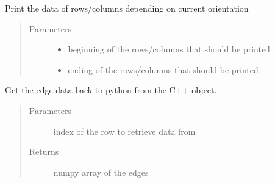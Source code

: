 \documentclass[a4paper,10pt,english]{sphinxmanual}
\begin{document}
\begin{fulllineitems}

\begin{fulllineitems}
\label{\detokenize{drc:kppc.drc.kppc.drc.slcleaner.PyDrcSl.printvector}}
Print the data of rows/columns depending on current orientation
\begin{quote}\begin{description}
\item[{Parameters}] \leavevmode\begin{itemize}
\item {} 
 \textendash{} beginning of the rows/columns that should be printed

\item {} 
 \textendash{} ending of the rows/columns that should be printed

\end{itemize}

\end{description}\end{quote}

\end{fulllineitems}


\begin{fulllineitems}
\label{\detokenize{drc:kppc.drc.kppc.drc.slcleaner.PyDrcSl.get_row}}
Get the edge data back to python from the C++ object.
\begin{quote}\begin{description}
\item[{Parameters}] \leavevmode
{} \textendash{} index of the row to retrieve data from

\item[{Returns}] \leavevmode
numpy array of the edges

\end{description}\end{quote}

\end{fulllineitems}



\end{fulllineitems}
\end{document}
